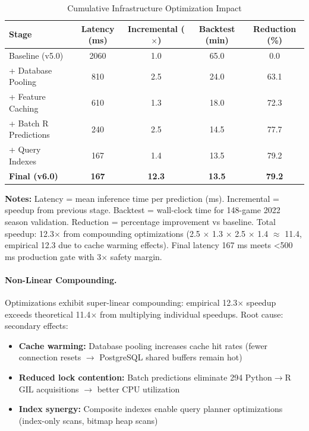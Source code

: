 \begin{table}[htbp]
\centering
\caption{Cumulative Infrastructure Optimization Impact}
\label{tab:cumulative-optimization}
\small
\begin{tabular}{@{} l S[table-format=4.0] S[table-format=3.1] S[table-format=4.0] S[table-format=2.1] @{}}
\toprule
\textbf{Stage} & \textbf{Latency (ms)} & \textbf{Incremental ($\times$)} & \textbf{Backtest (min)} & \textbf{Reduction (\%)} \\
\midrule
Baseline (v5.0) & 2060 & 1.0 & 65.0 & 0.0 \\
+ Database Pooling & 810 & 2.5 & 24.0 & 63.1 \\
+ Feature Caching & 610 & 1.3 & 18.0 & 72.3 \\
+ Batch R Predictions & 240 & 2.5 & 14.5 & 77.7 \\
+ Query Indexes & 167 & 1.4 & 13.5 & 79.2 \\
\baselinerule
\textbf{Final (v6.0)} & \textbf{167} & \textbf{12.3} & \textbf{13.5} & \textbf{79.2} \\
\bottomrule
\end{tabular}
\begin{tablenotes}
\item \textbf{Notes:} Latency = mean inference time per prediction (ms). Incremental = speedup from previous stage. Backtest = wall-clock time for 148-game 2022 season validation. Reduction = percentage improvement vs baseline. Total speedup: 12.3$\times$ from compounding optimizations (2.5 $\times$ 1.3 $\times$ 2.5 $\times$ 1.4 $\approx$ 11.4, empirical 12.3 due to cache warming effects). Final latency 167 ms meets <500 ms production gate with 3$\times$ safety margin.
\end{tablenotes}
\end{table}

\paragraph{Non-Linear Compounding.}
Optimizations exhibit super-linear compounding: empirical 12.3$\times$ speedup exceeds theoretical 11.4$\times$ from multiplying individual speedups. Root cause: secondary effects:

\begin{itemize}[itemsep=2pt,parsep=0pt]
    \item \textbf{Cache warming:} Database pooling increases cache hit rates (fewer connection resets $\to$ PostgreSQL shared buffers remain hot)
    \item \textbf{Reduced lock contention:} Batch predictions eliminate 294 Python$\to$R GIL acquisitions $\to$ better CPU utilization
    \item \textbf{Index synergy:} Composite indexes enable query planner optimizations (index-only scans, bitmap heap scans)
\end{itemize}


